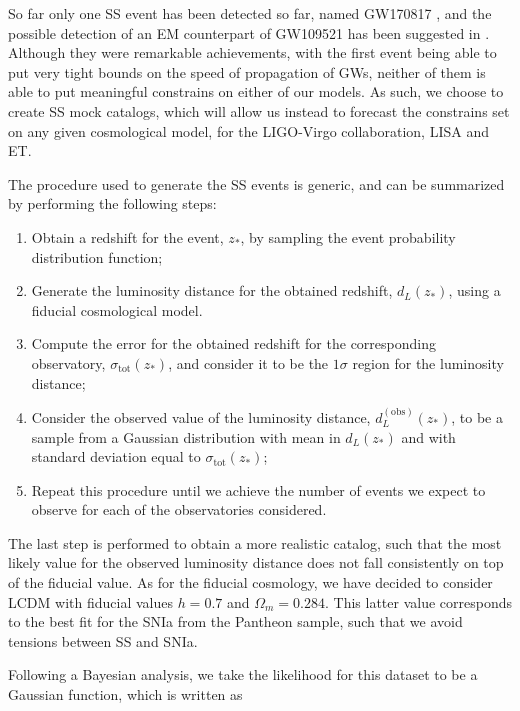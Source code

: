 So far only one \gls{SS} event has been detected so far, named GW170817 \cite{GW170817}, and the possible detection of an \gls{EM} counterpart of GW109521 \cite{GW190521} has been suggested in \cite{GW190521-EM}. Although they were remarkable achievements, with the first event being able to put very tight bounds on the speed of propagation of \glspl{GW}, neither of them is able to put meaningful constrains on either of our models. As such, we choose to create \gls{SS} mock catalogs, which will allow us instead to forecast the constrains set on any given cosmological model, for the \gls{LIGO}-Virgo collaboration, \gls{LISA} and \gls{ET}.

The procedure used to generate the \gls{SS} events is generic, and can be summarized by performing the following steps:

\begin{enumerate}
    \item Obtain a redshift for the event, $z_*$, by sampling the event probability distribution function;
    \item Generate the luminosity distance for the obtained redshift, $d_L(z_*)$, using a fiducial cosmological model.
    \item Compute the error for the obtained redshift for the corresponding observatory, $\sigma_\text{tot}(z_*)$, and consider it to be the $1 \sigma$ region for the luminosity distance;
    \item Consider the observed value of the luminosity distance, $d_L^{(\text{obs})}(z_*)$, to be a sample from a Gaussian distribution with mean in $d_L(z_*)$ and with standard deviation equal to $\sigma_\text{tot}(z_*)$;
    \item Repeat this procedure until we achieve the number of events we expect to observe for each of the observatories considered.
\end{enumerate}

\noindent The last step is performed to obtain a more realistic catalog, such that the most likely value for the observed luminosity distance does not fall consistently on top of the fiducial value. As for the fiducial cosmology, we have decided to consider \gls{LCDM} with fiducial values $h = 0.7$ and $\Omega_m = 0.284$. This latter value corresponds to the best fit for the \gls{SNIa} from the Pantheon sample, such that we avoid tensions between \gls{SS} and \gls{SNIa}.

Following a Bayesian analysis, we take the likelihood for this dataset to be a Gaussian function, which is written as

